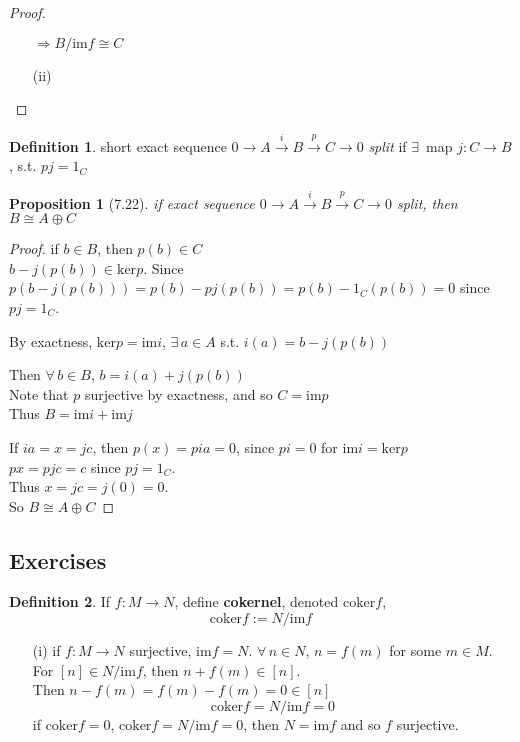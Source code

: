 \documentclass[twoside,landscape]{amsart}
\theoremstyle{plain}
\newtheorem{proposition}{Proposition}
\theoremstyle{definition}
\newtheorem{definition}{Definition}
\theoremstyle{remark}
\newcommand{\exercisehead}[1]
  { \smallskip
   \noindent{\small\bf Exercise #1.}
  }
\begin{document}
\begin{multicols*}{2}
\begin{proof}
\begin{enumerate}
$\Longrightarrow B/\text{im}f \cong C$  
\item[(ii)]
\end{enumerate}
\end{proof}

\begin{definition}
  short exact sequence $0 \to A \xrightarrow{i} B \xrightarrow{p} C \to 0$ \emph{split} if $\exists \, $ map $j: C \to B$, s.t. $pj=1_C$
\end{definition}

\begin{proposition}[7.22]
  if exact sequence $0 \to A \xrightarrow{i} B \xrightarrow{p} C \to 0$ split, then $B \cong A \oplus C$  
\end{proposition}

\begin{proof}
  if $b \in B$, then $p(b) \in C$ \\
$b - j(p(b)) \in \text{ker}p$.  Since $p(b-j(p(b))) = p(b) - pj(p(b)) = p(b) -1_C(p(b)) = 0$ since $pj=1_C$.  

By exactness, $\text{ker}p = \text{im}i$, $\exists \, a \in A$ s.t. $i(a) = b-j(p(b))$

Then $\forall \, b \in B$, $b=i(a) + j(p(b))$ \\
\phantom{Then} Note that $p$ surjective by exactness, and so $C = \text{im}p$ \\
Thus $B = \text{im}i + \text{im}j$

If $ia=x=jc$, then $p(x) = pia=0$, since $pi =0$ for $\text{im}i = \text{ker}p$ \\
\phantom{if} $px=pjc =c$ since $pj=1_C$.  \\
Thus $x=jc = j(0) =0$.  \\
So $B \cong A\oplus C$
\end{proof}

\subsection*{Exercises}

\begin{definition}
If $f: M \to N$, define \textbf{cokernel}, denoted $\text{coker}f$, 
\begin{equation}
  \text{coker}f := N/ \text{im}f
\end{equation}
\end{definition}

\exercisehead{7.13} 
\begin{enumerate}
\item[(i)] if $f:M \to N$ surjective, $\text{im}f =N$.  $\forall \, n \in N$, $n=f(m)$ for some $m\in M$.  \\
For $[n] \in N/\text{im}f$, then $n+f(m) \in [n]$.  \\
\phantom{For } Then $n-f(m) = f(m) -f(m) = 0 \in [n]$
\[
\text{coker}f = N/\text{im}f = 0
\]
if $\text{coker}f =0$, $\text{coker}f = N/\text{im}f =0$, then $N=\text{im}f$ and so $f$ surjective.  


\end{enumerate}
\end{multicols*}
\end{document}
